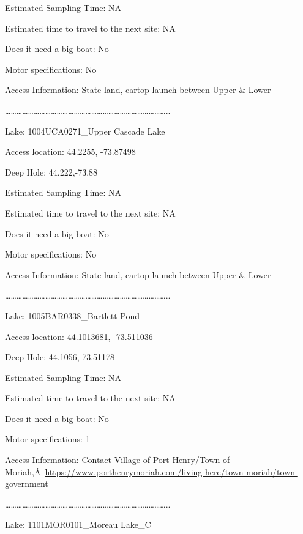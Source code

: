 \documentclass[]{article}
\begin{document}
Estimated Sampling Time: NA

Estimated time to travel to the next site: NA

Does it need a big boat: No

Motor specifications: No

Access Information: State land, cartop launch between Upper \& Lower

\ldots{}\ldots{}\ldots{}\ldots{}\ldots{}\ldots{}\ldots{}\ldots{}\ldots{}\ldots{}\ldots{}\ldots{}\ldots{}\ldots{}\ldots{}\ldots{}\ldots{}\ldots{}\ldots{}\ldots{}\ldots{}\ldots{}\ldots{}\ldots{}\ldots{}\ldots{}\ldots{}\ldots{}..

Lake: 1004UCA0271\_Upper Cascade Lake

Access location: 44.2255, -73.87498

Deep Hole: 44.222,-73.88

Estimated Sampling Time: NA

Estimated time to travel to the next site: NA

Does it need a big boat: No

Motor specifications: No

Access Information: State land, cartop launch between Upper \& Lower

\ldots{}\ldots{}\ldots{}\ldots{}\ldots{}\ldots{}\ldots{}\ldots{}\ldots{}\ldots{}\ldots{}\ldots{}\ldots{}\ldots{}\ldots{}\ldots{}\ldots{}\ldots{}\ldots{}\ldots{}\ldots{}\ldots{}\ldots{}\ldots{}\ldots{}\ldots{}\ldots{}\ldots{}..

Lake: 1005BAR0338\_Bartlett Pond

Access location: 44.1013681, -73.511036

Deep Hole: 44.1056,-73.51178

Estimated Sampling Time: NA

Estimated time to travel to the next site: NA

Does it need a big boat: No

Motor specifications: 1

Access Information: Contact Village of Port Henry/Town of
Moriah,Â~\url{https://www.porthenrymoriah.com/living-here/town-moriah/town-government}

\ldots{}\ldots{}\ldots{}\ldots{}\ldots{}\ldots{}\ldots{}\ldots{}\ldots{}\ldots{}\ldots{}\ldots{}\ldots{}\ldots{}\ldots{}\ldots{}\ldots{}\ldots{}\ldots{}\ldots{}\ldots{}\ldots{}\ldots{}\ldots{}\ldots{}\ldots{}\ldots{}\ldots{}..

Lake: 1101MOR0101\_Moreau Lake\_C
\end{document}
